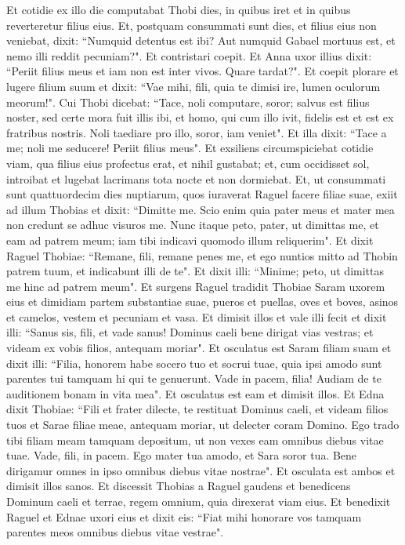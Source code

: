 \begin{biblechapter}  
\verse Et cotidie ex illo die computabat Thobi dies, in quibus iret et in quibus reverteretur filius eius. Et, postquam consummati sunt dies, et filius eius non veniebat, 
\verse dixit: “Numquid detentus est ibi? Aut numquid Gabael mortuus est, et nemo illi reddit pecuniam?". 
\verse Et contristari coepit. 
\verse Et Anna uxor illius dixit: “Periit filius meus et iam non est inter vivos. Quare tardat?". Et coepit plorare et lugere filium suum et dixit: 
\verse “Vae mihi, fili, quia te dimisi ire, lumen oculorum meorum!". 
\verse Cui Thobi dicebat: “Tace, noli computare, soror; salvus est filius noster, sed certe mora fuit illis ibi, et homo, qui cum illo ivit, fidelis est et est ex fratribus nostris. Noli taediare pro illo, soror, iam veniet". 
\verse Et illa dixit: “Tace a me; noli me seducere! Periit filius meus". Et exsiliens circumspiciebat cotidie viam, qua filius eius profectus erat, et nihil gustabat; et, cum occidisset sol, introibat et lugebat lacrimans tota nocte et non dormiebat. Et, ut consummati sunt quattuordecim dies nuptiarum, quos iuraverat Raguel facere filiae suae, exiit ad illum Thobias et dixit: “Dimitte me. Scio enim quia pater meus et mater mea non credunt se adhuc visuros me. Nunc itaque peto, pater, ut dimittas me, et eam ad patrem meum; iam tibi indicavi quomodo illum reliquerim". 
\verse Et dixit Raguel Thobiae: “Remane, fili, remane penes me, et ego nuntios mitto ad Thobin patrem tuum, et indicabunt illi de te". 
\verse Et dixit illi: “Minime; peto, ut dimittas me hinc ad patrem meum". 
\verse Et surgens Raguel tradidit Thobiae Saram uxorem eius et dimidiam partem substantiae suae, pueros et puellas, oves et boves, asinos et camelos, vestem et pecuniam et vasa. 
\verse Et dimisit illos et vale illi fecit et dixit illi: “Sanus sis, fili, et vade sanus! Dominus caeli bene dirigat vias vestras; et videam ex vobis filios, antequam moriar". 
\verse Et osculatus est Saram filiam suam et dixit illi: “Filia, honorem habe socero tuo et socrui tuae, quia ipsi amodo sunt parentes tui tamquam hi qui te genuerunt. Vade in pacem, filia! Audiam de te auditionem bonam in vita mea". Et osculatus est eam et dimisit illos. Et Edna dixit Thobiae: “Fili et frater dilecte, te restituat Dominus caeli, et videam filios tuos et Sarae filiae meae, antequam moriar, ut delecter coram Domino. Ego trado tibi filiam meam tamquam depositum, ut non vexes eam omnibus diebus vitae tuae. Vade, fili, in pacem. Ego mater tua amodo, et Sara soror tua. Bene dirigamur omnes in ipso omnibus diebus vitae nostrae". Et osculata est ambos et dimisit illos sanos. 
\verse Et discessit Thobias a Raguel gaudens et benedicens Dominum caeli et terrae, regem omnium, quia direxerat viam eius. Et benedixit Raguel et Ednae uxori eius et dixit eis: “Fiat mihi honorare vos tamquam parentes meos omnibus diebus vitae vestrae". 
\end{biblechapter}

